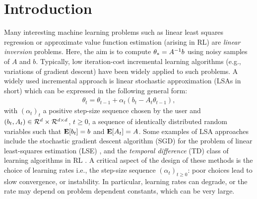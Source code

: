 \section{Introduction}\label{sec:intro}
Many interesting machine learning problems such as linear least squares regression or approximate value function estimation (arising in RL) are \emph{linear inversion} problems. Here, the aim is to compute $\theta_*=A^{-1}b$ using noisy samples of $A$ and $b$. Typically, low iteration-cost incremental learning algorithms (e.g., variations of gradient descent) have been widely applied to such problems. A widely used incremental approach is  linear stochastic approximation (LSAs in short) which can be expressed in the following general form:
\begin{align}\label{eq:lsaintro}
\theta_t=\theta_{t-1}+\alpha_t (b_t-A_t \theta_{t-1}),
\end{align}
with $(\alpha_t)_t$ a positive step-size sequence chosen by the user and 
$(b_t,A_t)\in \mathcal{R}^d\times \mathcal{R}^{d \times d}$,  $t\geq 0$, a sequence of identically distributed random variables such that $\mathbf{E}[b_t]=b$ and $\mathbf{E}[A_t]=A$. Some examples of LSA approaches include the stochastic gradient descent algorithm (SGD) for the problem of linear least-squares estimation  (LSE) \cite{bach,bachaistats}, and the \emph{temporal difference} (TD) class of learning algorithms in RL \cite{sutton,konda-tsitsiklis,KoTsi03:LSA,gtd,gtd2,gtdmp}.
 A critical aspect of the design of these methods is the choice of learning rates i.e., the step-size sequence $(\alpha_t)_{t\geq 0}$: poor choices lead to slow convergence, or instability. In particular, learning rates can degrade, or the rate may depend on problem dependent constants, which can be very large. 
